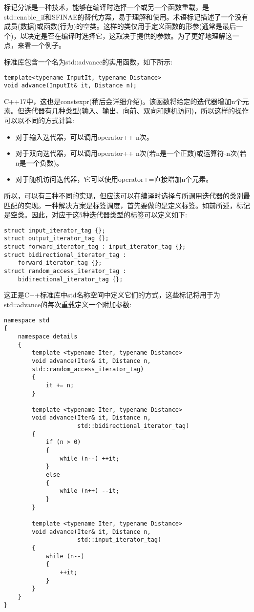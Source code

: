 
标记分派是一种技术，能够在编译时选择一个或另一个函数重载，是std::enable\_if和SFINAE的替代方案，易于理解和使用。术语标记描述了一个没有成员(数据)或函数(行为)的空类。这样的类仅用于定义函数的形参(通常是最后一个)，以决定是否在编译时选择它，这取决于提供的参数。为了更好地理解这一点，来看一个例子。

标准库包含一个名为std::advance的实用函数，如下所示:

\begin{lstlisting}[style=styleCXX]
template<typename InputIt, typename Distance>
void advance(InputIt& it, Distance n);
\end{lstlisting}

C++17中，这也是constexpr(稍后会详细介绍)。该函数将给定的迭代器增加n个元素。但迭代器有几种类型(输入、输出、向前、双向和随机访问)，所以这样的操作可以以不同的方式计算:

\begin{itemize}
\item
对于输入迭代器，可以调用operator++ n次。

\item
对于双向迭代器，可以调用operator++ n次(若n是一个正数)或运算符-n次(若n是一个负数)。

\item
对于随机访问迭代器，它可以使用operator+=直接增加n个元素。
\end{itemize}

所以，可以有三种不同的实现，但应该可以在编译时选择与所调用迭代器的类别最匹配的实现。一种解决方案是标签调度，首先要做的是定义标签。如前所述，标记是空类。因此，对应于这5种迭代器类型的标签可以定义如下:

\begin{lstlisting}[style=styleCXX]
struct input_iterator_tag {};
struct output_iterator_tag {};
struct forward_iterator_tag : input_iterator_tag {};
struct bidirectional_iterator_tag :
	forward_iterator_tag {};
struct random_access_iterator_tag :
	bidirectional_iterator_tag {};
\end{lstlisting}

这正是C++标准库中std名称空间中定义它们的方式，这些标记将用于为std::advance的每次重载定义一个附加参数:

\begin{lstlisting}[style=styleCXX]
namespace std
{
	namespace details
	{
		template <typename Iter, typename Distance>
		void advance(Iter& it, Distance n,
		std::random_access_iterator_tag)
		{
			it += n;
		}
	
		template <typename Iter, typename Distance>
		void advance(Iter& it, Distance n,
					 std::bidirectional_iterator_tag)
		{
			if (n > 0)
			{
				while (n--) ++it;
			}
			else
			{
				while (n++) --it;
			}
		}

		template <typename Iter, typename Distance>
		void advance(Iter& it, Distance n,
				     std::input_iterator_tag)
		{
			while (n--)
			{
				++it;
			}
		}
	}
}
\end{lstlisting}

